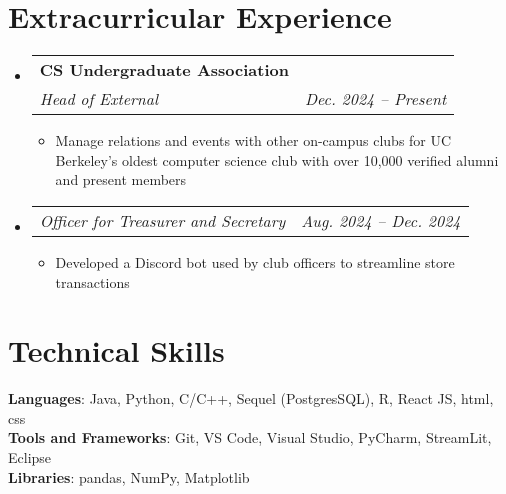 \documentclass[letterpaper,11pt]{article}
\makeatletter
\newcommand{\resumeItem}[1]{
  \item\small{
    {#1 \vspace{-2pt}}
  }
}
\newcommand{\resumeSubheading}[4]{
  \vspace{-2pt}\item
    \begin{tabular*}{0.97\textwidth}[t]{l@{\extracolsep{\fill}}r}
      \textbf{#1} & #2 \\
      \textit{\small#3} & \textit{\small #4} \\
    \end{tabular*}\vspace{-7pt}
}
\newcommand{\resumeSubSubheading}[2]{
    \item
    \begin{tabular*}{0.97\textwidth}{l@{\extracolsep{\fill}}r}
      \textit{\small#1} & \textit{\small #2} \\
    \end{tabular*}\vspace{-7pt}
}
\newcommand{\resumeSubHeadingListStart}{\begin{itemize}[leftmargin=0.15in, label={}]}
\newcommand{\resumeSubHeadingListEnd}{\end{itemize}}
\newcommand{\resumeItemListStart}{\begin{itemize}}
\newcommand{\resumeItemListEnd}{\end{itemize}\vspace{-5pt}}
\makeatother
\begin{document}
\section{Extracurricular Experience}
  \resumeSubHeadingListStart
    \resumeSubheading
      {CS Undergraduate Association}{}
      {Head of External}{Dec. 2024 -- Present}
      \resumeItemListStart
        \resumeItem{Manage relations and events with other on-campus clubs for UC Berkeley's oldest computer science club with over 10,000 verified alumni and present members}
      \resumeItemListEnd
       \resumeSubSubheading
     {Officer for Treasurer and Secretary }{Aug. 2024 -- Dec. 2024}
     \resumeItemListStart
        \resumeItem{Developed a Discord bot used by club officers to streamline store transactions}
     \resumeItemListEnd
\resumeSubHeadingListEnd
%
\section{Technical Skills}
 \begin{itemize}[leftmargin=0.15in, label={}]
    \small{\item{
     \textbf{Languages}{: Java, Python, C/C++, Sequel (PostgresSQL), R, React JS, html, css} \\
     \textbf{Tools and Frameworks}{: Git, VS Code, Visual Studio, PyCharm, StreamLit, Eclipse} \\
     \textbf{Libraries}{: pandas, NumPy, Matplotlib}
    }}
 \end{itemize}

\end{document}
